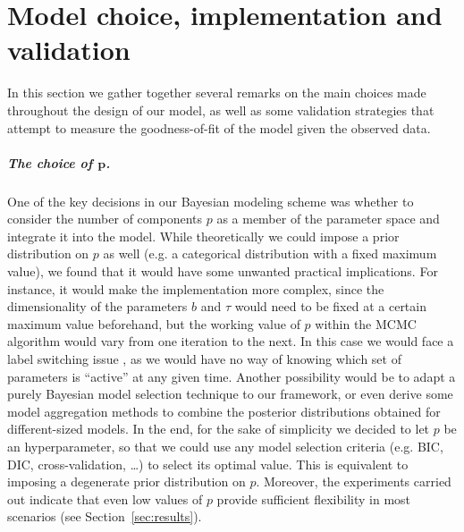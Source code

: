 %
%

\chapter{Model choice, implementation and validation}\label{ch:model-choice}
In this section we gather together several remarks on the main choices made throughout the design of our model, as well as some validation strategies that attempt to measure the goodness-of-fit of the model given the observed data.

\paragraph{The choice of \(\symbf p\).} One of the key decisions in our Bayesian modeling scheme was whether to consider the number of components \(p\) as a member of the parameter space and integrate it into the model. While theoretically we could impose a prior distribution on \(p\) as well (e.g. a categorical distribution with a fixed maximum value), we found that it would have some unwanted practical implications. For instance, it would make the implementation more complex, since the dimensionality of the parameters \(b\) and \(\tau\) would need to be fixed at a certain maximum value beforehand, but the working value of \(p\) within the MCMC algorithm would vary from one iteration to the next. In this case we would face a label switching issue \citep[c.f.][Sec.~2.3]{grollemund2019bayesian}, as we would have no way of knowing which set of parameters is ``active'' at any given time. Another possibility would be to adapt a purely Bayesian model selection technique \citep[e.g.][Ch.~7]{piironen2017comparison, gelman2013bayesian} to our framework, or even derive some model aggregation methods to combine the posterior distributions obtained for different-sized models. In the end, for the sake of simplicity we decided to let \(p\) be an hyperparameter, so that we could use any model selection criteria (e.g. BIC, DIC, cross-validation, \ldots) to select its optimal value. This is equivalent to imposing a degenerate prior distribution on \(p\). Moreover, the experiments carried out indicate that even low values of \(p\) provide sufficient flexibility in most scenarios (see Section~\ref{sec:results}). 

